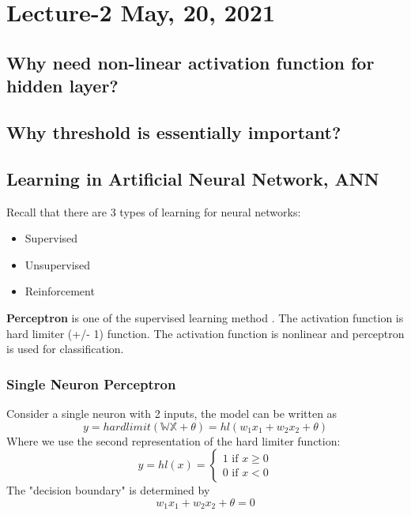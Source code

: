 \chapter{Lecture-2 May, 20, 2021}

\section{Why need non-linear activation function for hidden layer?}

\noindent{\color{red} \rule{\linewidth}{0.5mm}}
\section{Why threshold is essentially important?}
\noindent{\color{red} \rule{\linewidth}{0.5mm}}
\section{Learning in Artificial Neural Network, ANN}
Recall that there are 3 types of learning for neural networks:
\begin{itemize}
    \item Supervised
    \item Unsupervised
    \item Reinforcement
\end{itemize}
\textbf{Perceptron} is one of the supervised learning method . The activation function is hard limiter (+/- 1) function. The activation function is nonlinear and perceptron is used for classification.

\subsection{Single Neuron Perceptron}
Consider a single neuron with 2 inputs, the model can be written as 
\begin{equation}
y =hardlimit( \mathbb{W}\mathbb{X}+\theta)
 =hl(w_1x_1+w_2x_2+\theta)
\end{equation}
Where we use the second representation of the hard limiter function:
\begin{equation}
y = hl(x) = \left\{ {\begin{array}{*{20}{c}}
{1{\textrm{ if }}x \ge 0}\\
{ 0 {\textrm{ if }}x < 0}
\end{array}} \right.
\end{equation}
The "decision boundary" is determined by
\begin{equation}
 w_1x_1+w_2x_2+\theta = 0   
\end{equation}

